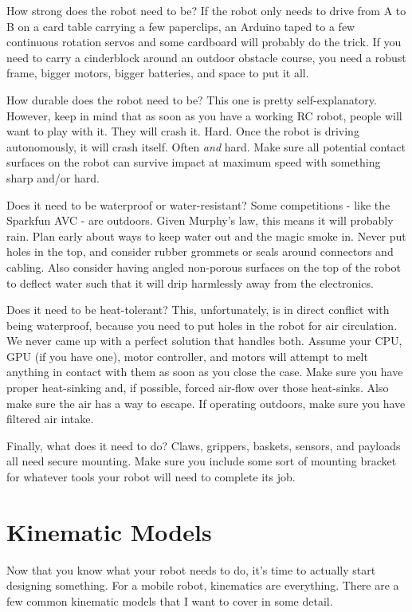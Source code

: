 How strong does the robot need to be? If the robot only needs to drive from A to B on a card table carrying a few paperclips, an Arduino taped to a few continuous rotation servos and some cardboard will probably do the trick. If you need to carry a cinderblock around an outdoor obstacle course, you need a robust frame, bigger motors, bigger batteries, and space to put it all.

How durable does the robot need to be? This one is pretty self-explanatory. However, keep in mind that as soon as you have a working RC robot, people will want to play with it. They will crash it. Hard. Once the robot is driving autonomously, it will crash itself. Often \textit{and} hard. Make sure all potential contact surfaces on the robot can survive impact at maximum speed with something sharp and/or hard.

Does it need to be waterproof or water-resistant? Some competitions - like the Sparkfun AVC - are outdoors. Given Murphy's law, this means it will probably rain. Plan early about ways to keep water out and the magic smoke in. Never put holes in the top, and consider rubber grommets or seals around connectors and cabling. Also consider having angled non-porous surfaces on the top of the robot to deflect water such that it will drip harmlessly away from the electronics.

Does it need to be heat-tolerant? This, unfortunately, is in direct conflict with being waterproof, because you need to put holes in the robot for air circulation. We never came up with a perfect solution that handles both. Assume your CPU, GPU (if you have one), motor controller, and motors will attempt to melt anything in contact with them as soon as you close the case. Make sure you have proper heat-sinking and, if possible, forced air-flow over those heat-sinks. Also make sure the air has a way to escape. If operating outdoors, make sure you have filtered air intake.

Finally, what does it need to do? Claws, grippers, baskets, sensors, and payloads all need secure mounting. Make sure you include some sort of mounting bracket for whatever tools your robot will need to complete its job.

\section{Kinematic Models}\label{section:kinematicModels}

Now that you know what your robot needs to do, it's time to actually start designing something. For a mobile robot, kinematics are everything. There are a few common kinematic models that I want to cover in some detail.

